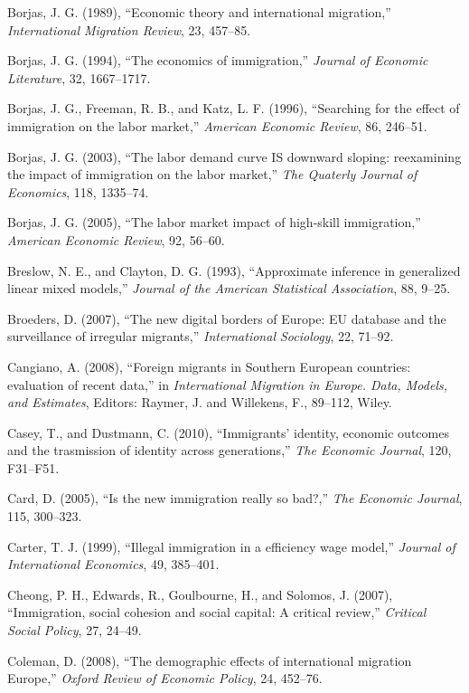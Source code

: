 \documentclass[10pt] {article}
\theoremstyle{definition}
\theoremstyle{plain}
\begin{document}
\begin{thebibliography}{99}
\bibitem{} Borjas, J. G. (1989), ``Economic theory and international migration,'' \textit{International Migration Review}, 23, 457--85.

\bibitem{} Borjas, J. G. (1994), ``The economics of immigration,'' \textit{Journal of Economic Literature}, 32, 1667--1717.

\bibitem{} Borjas, J. G., Freeman, R. B., and Katz, L. F. (1996), ``Searching for the effect of immigration on the labor market,'' \textit{American Economic Review}, 86, 246--51.

\bibitem{} Borjas, J. G. (2003), ``The labor demand curve IS downward sloping: reexamining the impact of immigration on the labor market,'' \textit{The Quaterly Journal of Economics}, 118, 1335--74.

\bibitem{} Borjas, J. G. (2005), ``The labor market impact of high-skill immigration,'' \textit{American Economic Review}, 92, 56--60.

\bibitem{} Breslow, N. E., and Clayton, D. G. (1993), ``Approximate inference in generalized linear mixed models,'' \textit{Journal of the American Statistical Association}, 88, 9--25.

\bibitem{} Broeders, D. (2007), ``The new digital borders of Europe: EU database and the surveillance of irregular migrants,'' \textit{International Sociology}, 22, 71--92.

\bibitem{} Cangiano, A. (2008), ``Foreign migrants in Southern European countries: evaluation of recent data,'' in \textit{International Migration in Europe. Data, Models, and Estimates}, Editors: Raymer, J. and Willekens, F., 89--112, Wiley.

\bibitem{} Casey, T., and Dustmann, C. (2010), ``Immigrants' identity, economic outcomes and the trasmission of identity across generations,'' \textit{The Economic Journal}, 120, F31--F51.

\bibitem{} Card, D. (2005), ``Is the new immigration really so bad?,'' \textit{The Economic Journal}, 115, 300--323.

\bibitem{} Carter, T. J. (1999), ``Illegal immigration in a efficiency wage model,'' \textit{Journal of International Economics}, 49, 385--401.

\bibitem{} Cheong, P. H., Edwards, R., Goulbourne, H., and Solomos, J. (2007), ``Immigration, social cohesion and social capital: A critical review,'' \textit{Critical Social Policy}, 27, 24--49.

\bibitem{} Coleman, D. (2008), ``The demographic effects of international migration Europe,'' \textit{Oxford Review of Economic Policy}, 24, 452--76.


\end{thebibliography}
\end{document}
